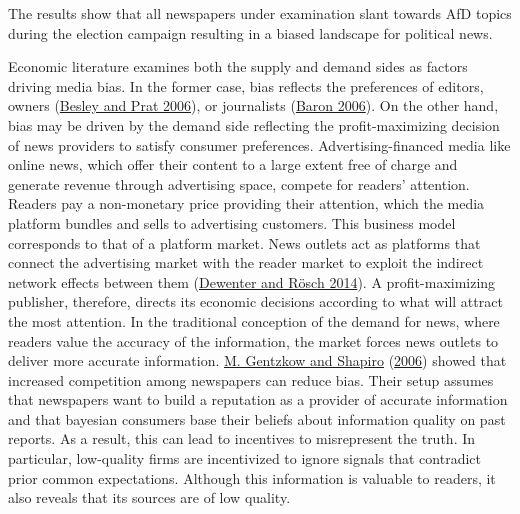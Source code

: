 \documentclass[
  12pt,
]{article}
\begin{document}
The results show that all newspapers under examination slant towards AfD
topics during the election campaign resulting in a biased landscape for
political news.

Economic literature examines both the supply and demand sides as factors
driving media bias. In the former case, bias reflects the preferences of
editors, owners (\protect\hyperlink{ref-besley_handcuffs_2006}{Besley
and Prat 2006}), or journalists
(\protect\hyperlink{ref-baron_persistent_2006}{Baron 2006}). On the
other hand, bias may be driven by the demand side reflecting the
profit-maximizing decision of news providers to satisfy consumer
preferences. Advertising-financed media like online news, which offer
their content to a large extent free of charge and generate revenue
through advertising space, compete for readers' attention. Readers pay a
non-monetary price providing their attention, which the media platform
bundles and sells to advertising customers. This business model
corresponds to that of a platform market. News outlets act as platforms
that connect the advertising market with the reader market to exploit
the indirect network effects between them
(\protect\hyperlink{ref-dewenter_einfuhrung_2014}{Dewenter and Rösch
2014}). A profit-maximizing publisher, therefore, directs its economic
decisions according to what will attract the most attention. In the
traditional conception of the demand for news, where readers value the
accuracy of the information, the market forces news outlets to deliver
more accurate information.
\protect\hyperlink{ref-gentzkow_media_2006}{M. Gentzkow and Shapiro}
(\protect\hyperlink{ref-gentzkow_media_2006}{2006}) showed that
increased competition among newspapers can reduce bias. Their setup
assumes that newspapers want to build a reputation as a provider of
accurate information and that bayesian consumers base their beliefs
about information quality on past reports. As a result, this can lead to
incentives to misrepresent the truth. In particular, low-quality firms
are incentivized to ignore signals that contradict prior common
expectations. Although this information is valuable to readers, it also
reveals that its sources are of low quality.
\end{document}
